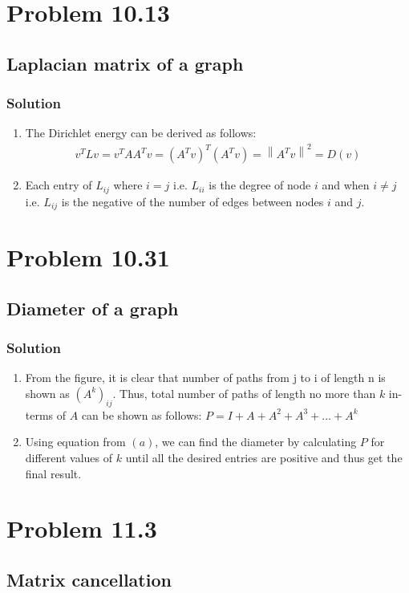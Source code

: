 \documentclass{article}
\newcommand{\norm}[1]{\left\lVert#1\right\rVert}
\begin{document}
\section*{Problem 10.13}
\subsection*{Laplacian matrix of a graph}
\subsubsection*{Solution}
\begin{enumerate}[label=\alph*]
    \item The Dirichlet energy can be derived as follows:
    \begin{align*}
        v^TLv = v^TAA^Tv = (A^Tv)^T(A^Tv) = \norm{A^Tv}^2 = D(v)
    \end{align*}
    \item Each entry of $L_{ij}$ where $i=j$ i.e. $L_{ii}$ is the degree of node $i$ and when $i\neq j$ i.e. $L_{ij}$  is the negative of the number of edges between nodes $i$ and $j$. 
\end{enumerate}
\section*{Problem 10.31}
\subsection*{Diameter of a graph}
\subsubsection*{Solution}
\begin{enumerate}[label=\alph*]
    \item From the figure, it is clear that number of paths from j to i of length n is shown as $(A^k)_{ij}$. Thus, total number of paths of length no more than $k$ in-terms of $A$ can be shown as follows: $P = I + A + A^2 + A^3 + \ldots + A^k$
    \item Using equation from $(a)$, we can find the diameter by calculating $P$ for different values of $k$ until all the desired entries are positive and thus get the final result. 
\end{enumerate}
\section*{Problem 11.3}
\subsection*{Matrix cancellation}
\end{document}
